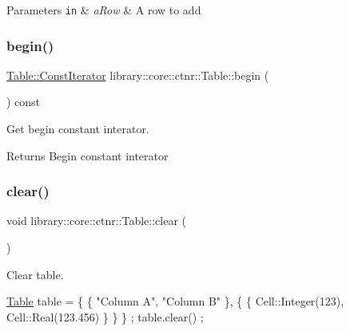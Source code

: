 \begin{DoxyParams}[1]{Parameters}
\mbox{\tt in}  & {\em a\+Row} & A row to add \\
\hline
\end{DoxyParams}
\mbox{\label{classlibrary_1_1core_1_1ctnr_1_1_table_ad9a420d9759797e8e8d9142da502a6c8}} 
\subsubsection{\texorpdfstring{begin()}{begin()}}
{\footnotesize\ttfamily \hyperlink{classlibrary_1_1core_1_1ctnr_1_1_table_a7fa78ad4e7e8d27ceab0bff51ab84fc3}{Table\+::\+Const\+Iterator} library\+::core\+::ctnr\+::\+Table\+::begin (\begin{DoxyParamCaption}{ }\end{DoxyParamCaption}) const}



Get begin constant interator. 

\begin{DoxyReturn}{Returns}
Begin constant interator 
\end{DoxyReturn}
\mbox{\label{classlibrary_1_1core_1_1ctnr_1_1_table_a82b89b7d22f40518054f6d507660e8b5}} 
\subsubsection{\texorpdfstring{clear()}{clear()}}
{\footnotesize\ttfamily void library\+::core\+::ctnr\+::\+Table\+::clear (\begin{DoxyParamCaption}{ }\end{DoxyParamCaption})}



Clear table. 


\begin{DoxyCode}
\hyperlink{classlibrary_1_1core_1_1ctnr_1_1_table_a5b11121caa4288c3da642af7c6a5a632}{Table} table = \{ \{ \textcolor{stringliteral}{"Column A"}, \textcolor{stringliteral}{"Column B"} \}, \{ \{ Cell::Integer(123), Cell::Real(123.456) \} \} \} ;
table.clear() ;
\end{DoxyCode}
 \mbox{\label{classlibrary_1_1core_1_1ctnr_1_1_table_ada8d9997351d5aea25ae8e563eedeb1c}} 
